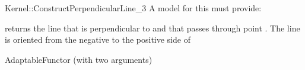 \begin{ccRefFunctionObjectConcept}{Kernel::ConstructPerpendicularLine_3}
A model for this must provide:


       {returns the line that is perpendicular to  and that
        passes through point . The line is oriented from
        the negative to the positive side of }

\ccRefines
AdaptableFunctor (with two arguments)

\ccSeeAlso
{} \\

\end{ccRefFunctionObjectConcept}
